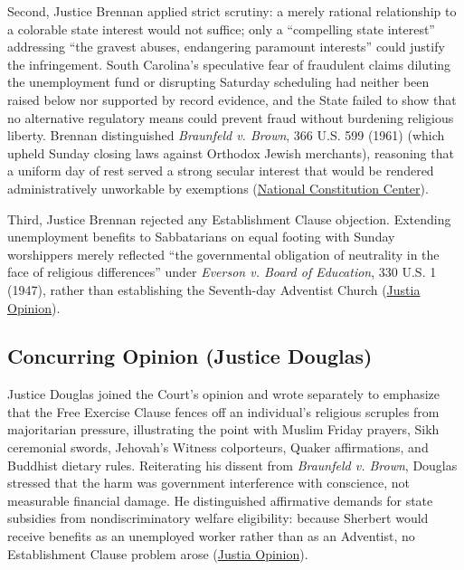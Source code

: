 \documentclass[12pt]{article}
\begin{document}
Second, Justice Brennan applied strict scrutiny: a merely rational relationship to a colorable state interest would not suffice; only a ``compelling state interest'' addressing ``the gravest abuses, endangering paramount interests'' could justify the infringement. South Carolina's speculative fear of fraudulent claims diluting the unemployment fund or disrupting Saturday scheduling had neither been raised below nor supported by record evidence, and the State failed to show that no alternative regulatory means could prevent fraud without burdening religious liberty. Brennan distinguished \textit{Braunfeld v. Brown}, 366 U.S. 599 (1961) (which upheld Sunday closing laws against Orthodox Jewish merchants), reasoning that a uniform day of rest served a strong secular interest that would be rendered administratively unworkable by exemptions (\href{https://constitutioncenter.org/the-constitution/supreme-court-case-library/sherbert-v-verner}{National Constitution Center}).

Third, Justice Brennan rejected any Establishment Clause objection. Extending unemployment benefits to Sabbatarians on equal footing with Sunday worshippers merely reflected ``the governmental obligation of neutrality in the face of religious differences'' under \textit{Everson v. Board of Education}, 330 U.S. 1 (1947), rather than establishing the Seventh-day Adventist Church (\href{https://supreme.justia.com/cases/federal/us/374/398/}{Justia Opinion}).

\subsection{Concurring Opinion (Justice Douglas)}

Justice Douglas joined the Court's opinion and wrote separately to emphasize that the Free Exercise Clause fences off an individual's religious scruples from majoritarian pressure, illustrating the point with Muslim Friday prayers, Sikh ceremonial swords, Jehovah's Witness colporteurs, Quaker affirmations, and Buddhist dietary rules. Reiterating his dissent from \textit{Braunfeld v. Brown}, Douglas stressed that the harm was government interference with conscience, not measurable financial damage. He distinguished affirmative demands for state subsidies from nondiscriminatory welfare eligibility: because Sherbert would receive benefits as an unemployed worker rather than as an Adventist, no Establishment Clause problem arose (\href{https://supreme.justia.com/cases/federal/us/374/398/}{Justia Opinion}).
\end{document}
